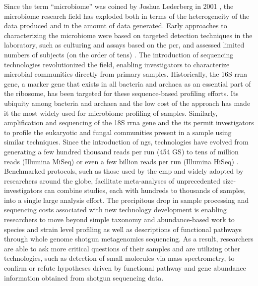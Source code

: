 Since the term “microbiome” was coined by Joshua Lederberg in 2001 \cite{Lederberg2001}, the microbiome research field has exploded both in terms of the heterogeneity of the data produced and in the amount of data generated. Early approaches to characterizing the microbiome were based on targeted detection techniques in the laboratory, such as culturing and assays based on the \gls{pcr}, and assessed limited numbers of subjects (on the order of tens) \cite{Brigidi2001}. The introduction of sequencing technologies revolutionized the field, enabling investigators to characterize microbial communities directly from primary samples. Historically, the 16S \gls{rrna} gene, a marker gene that exists in all bacteria and archaea as an essential part of the ribosome, has been targeted for these sequence-based profiling efforts. Its ubiquity among bacteria and archaea and the low cost of the approach has made it the most widely used for microbiome profiling of samples. Similarly, amplification and sequencing of the 18S \gls{rrna} gene and the \gls{its} permit investigators to profile the eukaryotic and fungal communities present in a sample using similar techniques. Since the introduction of \gls{ngs}, technologies have evolved from generating a few hundred thousand reads per run (454 GS) to tens of million reads (Illumina MiSeq) or even a few billion reads per run (Illumina HiSeq) \cite{Goodwin2016}. Benchmarked protocols, such as those used by the \gls{emp} and widely adopted by researchers around the globe, facilitate meta-analyses of unprecedented size-investigators can combine studies, each with hundreds to thousands of samples, into a single large analysis effort.
The precipitous drop in sample processing and sequencing costs associated with new technology development is enabling researchers to move beyond simple taxonomy and abundance-based work to species and strain level profiling as well as descriptions of functional pathways through whole genome shotgun metagenomics sequencing. As a result, researchers are able to ask more critical questions of their samples and are utilizing other technologies, such as detection of small molecules via mass spectrometry, to confirm or refute hypotheses driven by functional pathway and gene abundance information obtained from shotgun sequencing data.

